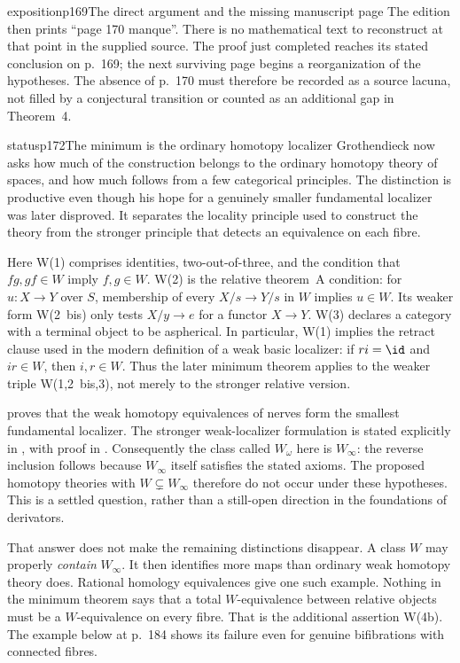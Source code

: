 \begin{dcomment}{exposition}{p169}{The direct argument and the missing manuscript page}
The edition then prints ``page 170 manque''. There is no mathematical text to reconstruct at that point in the supplied source. The proof just completed reaches its stated conclusion on p.~169; the next surviving page begins a reorganization of the hypotheses. The absence of p.~170 must therefore be recorded as a source lacuna, not filled by a conjectural transition or counted as an additional gap in Theorem~4.
\end{dcomment}

\begin{dcomment}{status}{p172}{The minimum is the ordinary homotopy localizer}
Grothendieck now asks how much of the construction belongs to the ordinary homotopy theory of spaces, and how much follows from a few categorical principles. The distinction is productive even though his hope for a genuinely smaller fundamental localizer was later disproved. It separates the locality principle used to construct the theory from the stronger principle that detects an equivalence on each fibre.

Here W(1) comprises identities, two-out-of-three, and the condition that $fg,gf\in W$ imply $f,g\in W$. W(2) is the relative theorem~A condition: for $u:X\to Y$ over $S$, membership of every $X/s\to Y/s$ in $W$ implies $u\in W$. Its weaker form W(2~bis) only tests $X/y\to e$ for a functor $X\to Y$. W(3) declares a category with a terminal object to be aspherical. In particular, W(1) implies the retract clause used in the modern definition of a weak basic localizer: if $ri=\id$ and $ir\in W$, then $i,r\in W$. Thus the later minimum theorem applies to the weaker triple W(1,2~bis,3), not merely to the stronger relative version.

\citet[Theorem~2.2.11, p.~136]{Cisinski2004Minimal} proves that the weak homotopy equivalences of nerves form the smallest fundamental localizer. The stronger weak-localizer formulation is stated explicitly in \citet[Theorem~1.5]{Cisinski2009LocallyConstant}, with proof in \citet[Theorem~6.1.18]{Cisinski2006}. Consequently the class called $W_\omega$ here is $W_\infty$: the reverse inclusion follows because $W_\infty$ itself satisfies the stated axioms. The proposed homotopy theories with $W\subsetneq W_\infty$ therefore do not occur under these hypotheses. This is a settled question, rather than a still-open direction in the foundations of derivators.

That answer does not make the remaining distinctions disappear. A class $W$ may properly \emph{contain} $W_\infty$. It then identifies more maps than ordinary weak homotopy theory does. Rational homology equivalences give one such example. Nothing in the minimum theorem says that a total $W$-equivalence between relative objects must be a $W$-equivalence on every fibre. That is the additional assertion W(4b). The example below at p.~184 shows its failure even for genuine bifibrations with connected fibres.


\end{dcomment}
